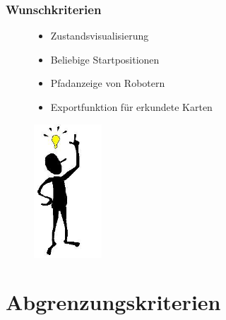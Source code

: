 \documentclass{beamer}
\begin{document}
\begin{frame}
  \frametitle{Wunschkriterien}
  	
	\begin{figure}[htbp]
	
	\begin{minipage}[t]{0.5\textwidth}
		\begin{itemize}
			\item Zustandsvisualisierung
			\item Beliebige Startpositionen
			\item Pfadanzeige von Robotern
			\item Exportfunktion für erkundete Karten
		\end{itemize}
	\end{minipage}
	\hfill
	\begin{minipage}[t]{5cm}
		\vspace{0pt}
		\includegraphics[height=5cm]{images/idee.jpg} 
	\end{minipage}
   \end{figure}  	
\end{frame}


\section{Abgrenzungskriterien}
\end{document}
